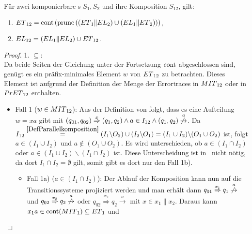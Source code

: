 \begin{satz}
\label{satzErrorSemanik}
  Für zwei komponierbare \EIO{}s $S_1, S_2$ und ihre Komposition
  $S_{12}$, gilt:
  \begin{enumerate}
    \item
      $ET{}_{12}=\mathrm{cont}{}\left(\mathrm{prune}{}\left(\left(ET{}_1\|EL{}_2\right)\cup
      \left(EL{}_1\|ET{}_2\right)\right)\right)$,
    \item $EL{}_{12}=(EL{}_1\|EL{}_2)\cup ET{}_{12}$.
  \end{enumerate}
\end{satz}

\begin{proof}
  1. \glqq{}$\subseteq$\grqq{}:\\
  Da beide Seiten der Gleichung unter der Fortsetzung $\mathrm{cont}{}$ abgeschlossen sind, genügt es ein
  präfix-minimales Element $w$ von $ET{}_{12}$ zu betrachten. Dieses Element ist
  aufgrund der Definition der Menge der Errortraces in $MIT{}_{12}$ oder in
  $PrET{}_{12}$ enthalten.
  \begin{itemize}
    \item Fall 1 ($w\in MIT{}_{12}$): Aus der Definition von \MIT{} folgt, dass es eine
  Aufteilung $w=xa$ gibt mit $(q_{01},q_{02})
  \overset{x}{\Rightarrow}(q_1,q_2)\wedge a\in I_{12}\wedge (q_1,q_2)
  \overset{a}{\not{\hspace{-0.1cm}\rightarrow}}$. Da $I_{12}
  \overset{\ref{DefParallelkomposition}}{=}(I_1\backslash O_2)\cup
  (I_2\backslash O_1)=(I_1\cup I_2)\backslash (O_1\cup O_2)$ ist, folgt $a\in (I_1\cup
  I_2)$ und $a\notin (O_1\cup O_2)$. Es wird unterschieden, ob $a\in (I_1\cap I_2)$
  oder $a\in (I_1\cup I_2)\backslash (I_1\cap I_2)$ ist. Diese Unterscheidung
  ist in~\cite{Vogler2014EIO} nicht nötig, da dort $I_1\cap I_2=\emptyset$
  gilt, somit gibt es dort nur den Fall 1b).
  \begin{itemize}
    \item Fall 1a) ($a\in (I_1\cap I_2)$): Der Ablauf der Komposition kann nun
      auf die Transitionssysteme projiziert werden und man erhält dann \oBdA{}
      $q_{01}\overset{x_1}{\Rightarrow} q_1
      \overset{a}{\not{\hspace{-0.1cm}\rightarrow}}$ und
      $q_{02}\overset{x_2}{\Rightarrow} q_2
      \overset{a}{\not{\hspace{-0.1cm}\rightarrow}}$ oder
      $q_{02}\overset{x_2}{\Rightarrow} q_2 \overset{a}{\rightarrow}$ mit $x\in
      x_1\|x_2$. Daraus kann $x_1a\in \mathrm{cont}{}(MIT{}_1)\subseteq ET{}_1$ und

\end{itemize}
\end{itemize}
\end{proof}
